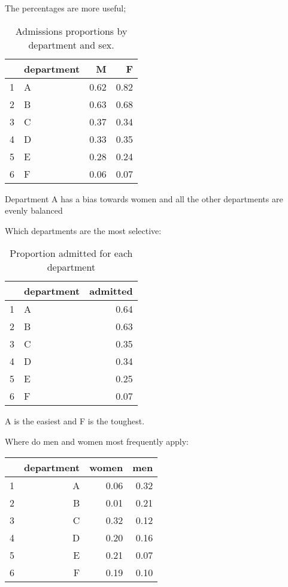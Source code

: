 \documentclass[landscape]{exam}
\begin{document}
  The percentages are more useful;

  \begin{table}[H]
    \centering
    \begin{tabular}{rlrr}
      \toprule
               & department & M    & F \\
      \midrule
      1        & A          & 0.62 & 0.82 \\
      2        & B          & 0.63 & 0.68 \\
      3        & C          & 0.37 & 0.34 \\
      4        & D          & 0.33 & 0.35 \\
      5        & E          & 0.28 & 0.24 \\
      6        & F          & 0.06 & 0.07 \\
      \bottomrule
    \end{tabular}
    \caption{Admissions proportions by department and sex.}
  \end{table}

  Department A has a bias towards women and all the other departments are
  evenly balanced

  Which departments are the most selective:

  \begin{table}[H]
    \centering
    \begin{tabular}{rlr}
      \toprule
               & department & admitted \\
      \midrule
      1        & A          & 0.64 \\
      2        & B          & 0.63 \\
      3        & C          & 0.35 \\
      4        & D          & 0.34 \\
      5        & E          & 0.25 \\
      6        & F          & 0.07 \\
      \bottomrule
    \end{tabular}
    \caption{Proportion admitted for each department}
  \end{table}

  A is the easiest and F is the toughest.

  Where do men and women most frequently apply:

  \begin{table}[H]
    \centering
    \begin{tabular}{rrrr}
      \toprule
               & department & women & men \\
      \midrule
      1        & A          & 0.06  & 0.32 \\
      2        & B          & 0.01  & 0.21 \\
      3        & C          & 0.32  & 0.12 \\
      4        & D          & 0.20  & 0.16 \\
      5        & E          & 0.21  & 0.07 \\
      6        & F          & 0.19  & 0.10 \\
      \bottomrule
    \end{tabular}
  \end{table}
\end{document}
